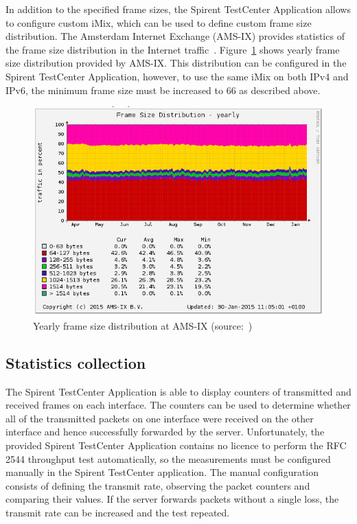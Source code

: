 In addition to the specified frame sizes, the Spirent TestCenter Application allows to configure custom iMix,
which can be used to define custom frame size distribution.
The Amsterdam Internet Exchange (AMS-IX) provides
statistics of the frame size distribution in the Internet traffic~\cite{amsix-frame-size}.
Figure~\ref{fig:analysis-amsix-frame-size} shows yearly frame size distribution provided by AMS-IX.
This distribution can be configured in the Spirent TestCenter Application, however,
to use the same iMix on both IPv4 and IPv6, the minimum frame size must be increased to 66 as described above.
\begin{figure}
	\centering
	\includegraphics[width=14.5cm,keepaspectratio]{fig/amsix.png}
	\caption{Yearly frame size distribution at AMS-IX (source:~\cite{amsix-frame-size})}
	\label{fig:analysis-amsix-frame-size}
\end{figure}

\subsection{Statistics collection}
The Spirent TestCenter Application is able to display counters of transmitted and received frames on each interface.
The counters can be used to determine whether all of the transmitted packets on one interface were received
on the other interface and hence successfully forwarded by the server.
Unfortunately, the provided Spirent TestCenter Application contains no licence to perform the RFC 2544 throughput test
automatically, so the measurements must be configured manually in the Spirent TestCenter application.
The manual configuration consists of defining the transmit rate, observing the packet counters and comparing their values.
If the server forwards packets without a single loss, the transmit rate can be increased and the test repeated.

